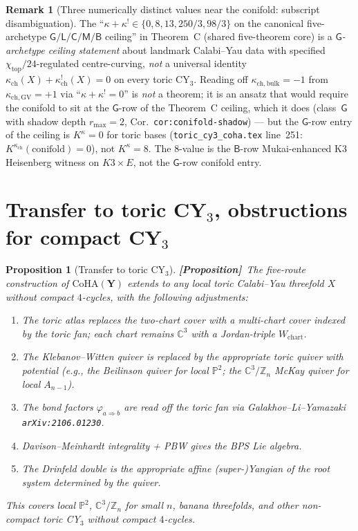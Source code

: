 \documentclass[11pt]{amsart}
\newtheorem{proposition}[theorem]{Proposition}
\theoremstyle{definition}
\newtheorem{remark}[theorem]{Remark}
\providecommand{\CoHA}{\mathrm{CoHA}}
\providecommand{\bY}{\mathbf{Y}}
\providecommand{\bZ}{\mathbb{Z}}
\providecommand{\bC}{\mathbb{C}}
\providecommand{\bP}{\mathbb{P}}
\providecommand{\ClaimStatusProposition}{\textbf{\textsf{[Proposition]}}}
\begin{document}
\begin{remark}[Three numerically distinct values near the conifold:
subscript disambiguation]
The ``$\kappa + \kappa^! \in \{0, 8, 13, 250/3, 98/3\}$ on the
canonical five-archetype $\mathsf{G}/\mathsf{L}/\mathsf{C}/\mathsf{M}/\mathsf{B}$
ceiling'' in Theorem~C (shared five-theorem core) is a
\emph{$\mathsf G$-archetype ceiling statement} about landmark
Calabi--Yau data with specified $\chi_{\mathrm{top}}/24$-regulated
centre-curving, \emph{not} a universal identity $\kappa_{\mathrm{ch}}(X)
+ \kappa_{\mathrm{ch}}^!(X) = 0$ on every toric CY$_3$. Reading off
$\kappa_{\mathrm{ch,bulk}} = -1$ from $\kappa_{\mathrm{ch,GV}} = +1$
via ``$\kappa + \kappa^! = 0$'' is \emph{not} a theorem; it is an
ansatz that would require the conifold to sit at the $\mathsf G$-row of
the Theorem~C ceiling, which it does (class~$\mathsf G$ with shadow
depth $r_{\max} = 2$, Cor.~\texttt{cor:conifold-shadow}) — but the
$\mathsf G$-row entry of the ceiling is $K^\kappa = 0$ for toric bases
(\texttt{toric\_cy3\_coha.tex} line~251:
$K^{\kappa_{\mathrm{ch}}}(\mathrm{conifold}) = 0$), not $K^\kappa = 8$.
The $8$-value is the $\mathsf B$-row Mukai-enhanced K3 Heisenberg
witness on $K3 \times E$, not the $\mathsf G$-row conifold entry.
\end{remark}

\section{Transfer to toric CY$_3$, obstructions for compact CY$_3$}
\label{sec:compact-obstruction}

\begin{proposition}[Transfer to toric CY$_3$]
\label{prop:toric-transfer}
\ClaimStatusProposition\
The five-route construction of $\CoHA(\bY)$ extends to any local
toric Calabi--Yau threefold $X$ without compact $4$-cycles, with the
following adjustments:
\begin{enumerate}[leftmargin=2em]
\item The toric atlas replaces the two-chart cover with a multi-chart
  cover indexed by the toric fan; each chart remains $\bC^3$ with a
  Jordan-triple $W_{\mathrm{chart}}$.
\item The Klebanov--Witten quiver is replaced by the appropriate
  toric quiver with potential (e.g., the Beilinson quiver for local
  $\bP^2$; the $\bC^3/\bZ_n$ McKay quiver for local $A_{n-1}$).
\item The bond factors $\varphi_{a \Rightarrow b}$ are read off the
  toric fan via Galakhov--Li--Yamazaki \texttt{arXiv:2106.01230}.
\item Davison--Meinhardt integrality + PBW gives the BPS Lie algebra.
\item The Drinfeld double is the appropriate affine (super-)Yangian
  of the root system determined by the quiver.
\end{enumerate}
This covers local $\bP^2$, $\bC^3/\bZ_n$ for small $n$, banana
threefolds, and other non-compact toric CY$_3$ without compact
$4$-cycles.
\end{proposition}
\end{document}

